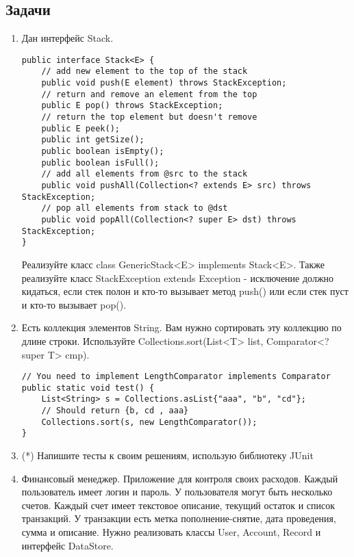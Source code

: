 \documentclass[a4paper,12pt]{extreport}
\begin{document}
\subsection*{Задачи}
\begin{enumerate}
    \item Дан интерфейс Stack. 
    \begin{lstlisting}
public interface Stack<E> {
    // add new element to the top of the stack
    public void push(E element) throws StackException;
    // return and remove an element from the top
    public E pop() throws StackException;
    // return the top element but doesn't remove
    public E peek();
    public int getSize();
    public boolean isEmpty();
    public boolean isFull();
    // add all elements from @src to the stack
    public void pushAll(Collection<? extends E> src) throws StackException;
    // pop all elements from stack to @dst
    public void popAll(Collection<? super E> dst) throws StackException;
}
    \end{lstlisting}
    Реализуйте класс class GenericStack<E> implements Stack<E>. Также реализуйте класс StackException extends Exception - исключение должно кидаться, если стек полон и кто-то вызывает метод push() или если стек пуст и кто-то вызывает pop().

    \item Есть коллекция элементов String. Вам нужно сортировать эту коллекцию по длине строки. Используйте Collections.sort(List<T> list, Comparator<? super T> cmp). 
    \begin{lstlisting}
// You need to implement LengthComparator implements Comparator
public static void test() {
    List<String> s = Collections.asList{"aaa", "b", "cd"};
    // Should return {b, cd , aaa}
    Collections.sort(s, new LengthComparator()); 
}

    \end{lstlisting}
    
    
    
    \item (*) Напишите тесты к своим решениям, использую библиотеку JUnit
    
    \item Финансовый менеджер. Приложение для контроля своих расходов. Каждый пользователь имеет логин и пароль. У пользователя могут быть несколько счетов. Каждый счет имеет текстовое описание, текущий остаток и список транзакций. У транзакции есть метка пополнение-снятие, дата проведения, сумма и описание. Нужно реализовать классы User, Account, Record и интерфейс DataStore. 
    

\end{enumerate}
\end{document}
